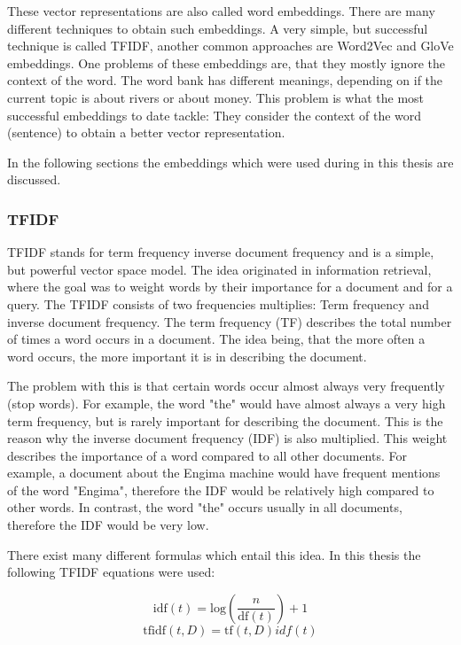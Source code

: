 \documentclass[draft,final,oneside]{vutinfth} %
\begin{document}
These vector representations are also called word embeddings. There are many different techniques to obtain such embeddings. A very simple, but successful technique is called TFIDF, another common approaches are Word2Vec and GloVe embeddings. One problems of these embeddings are, that they mostly ignore the context of the word. The word bank has different meanings, depending on if the current topic is about rivers or about money. This problem is what the most successful embeddings to date tackle: They consider the context of the word (sentence) to obtain a better vector representation.

In the following sections the embeddings which were used during in this thesis are discussed.

\subsubsection{TFIDF}
TFIDF stands for term frequency inverse document frequency and is a simple, but powerful vector space model. The idea originated in information retrieval, where the goal was to weight words by their importance for a document and for a query. The TFIDF consists of two frequencies multiplies: Term frequency and inverse document frequency. The term frequency (TF) describes the total number of times a word occurs in a document. The idea being, that the more often a word occurs, the more important it is in describing the document.

The problem with this is that certain words occur almost always very frequently (stop words). For example, the word "the" would have almost always a very high term frequency, but is rarely important for describing the document. This is the reason why the inverse document frequency (IDF) is also multiplied. This weight describes the importance of a word compared to all other documents. For example, a document about the Engima machine would have frequent mentions of the word "Engima", therefore the IDF would be relatively high compared to other words. In contrast, the word "the" occurs usually in all documents, therefore the IDF would be very low.

There exist many different formulas which entail this idea. In this thesis the following TFIDF equations were used:

\begin{equation}
\text{idf}(t) = \text{log} \left(\dfrac{n}{\text{df}(t)} \right) + 1
\end{equation}
\begin{equation}
\text{tfidf}(t, D) = \text{tf}(t, D)idf(t)
\end{equation}
\end{document}
